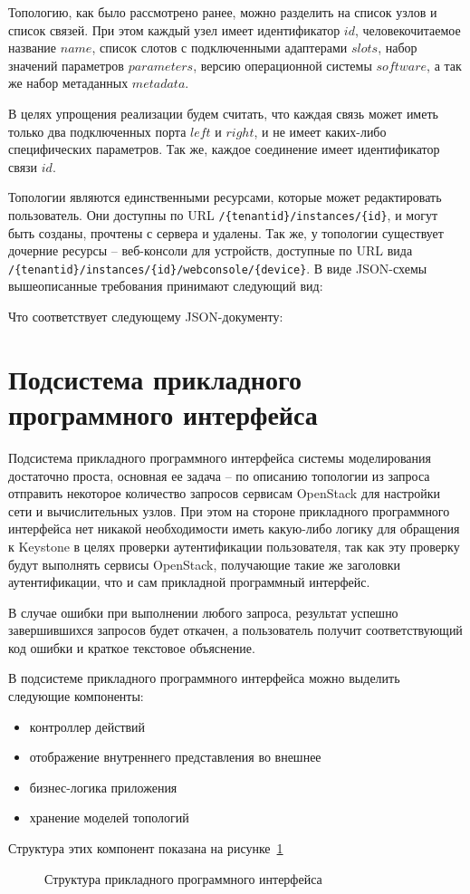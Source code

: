 Топологию, как было рассмотрено ранее, можно разделить на список узлов и список 
связей. При этом каждый узел имеет идентификатор $id$, человекочитаемое название
$name$, список слотов с подключенными адаптерами $slots$, 
набор значений параметров $parameters$, версию операционной системы $software$, 
а так же набор метаданных $metadata$. 

В целях упрощения реализации будем считать, что каждая связь может иметь только два 
подключенных порта  $left$ и $right$, и не имеет каких-либо специфических параметров.
Так же, каждое соединение имеет идентификатор связи $id$.

Топологии являются единственными ресурсами, которые может редактировать пользователь.
Они доступны по URL \verb`/{tenantid}/instances/{id}`, и могут быть созданы, прочтены с сервера и удалены.
Так же, у топологии существует дочерние ресурсы -- веб-консоли для устройств,
доступные по URL вида \verb`/{tenantid}/instances/{id}/webconsole/{device}`.
В виде JSON-схемы вышеописанные требования принимают следующий вид:



Что соответствует следующему JSON-документу:




\section{Подсистема прикладного программного интерфейса}

Подсистема прикладного программного интерфейса системы моделирования достаточно проста,
основная ее задача -- по описанию топологии из запроса отправить некоторое количество
запросов сервисам OpenStack для настройки сети и вычислительных узлов.
При этом на стороне прикладного программного интерфейса нет никакой необходимости 
иметь какую-либо логику для обращения к Keystone в целях проверки аутентификации пользователя,
так как эту проверку будут выполнять сервисы OpenStack, получающие такие же заголовки
аутентификации, что и сам прикладной программный интерфейс.

В случае ошибки при выполнении любого запроса, результат успешно завершившихся запросов
будет откачен, а пользователь получит соответствующий код ошибки и краткое текстовое объяснение.

В подсистеме прикладного программного интерфейса можно выделить следующие компоненты:
\begin{itemize}
    \item контроллер действий
    \item отображение внутреннего представления во внешнее
    \item бизнес-логика приложения
    \item хранение моделей топологий
\end{itemize}
Структура этих компонент показана на рисунке~\ref{fig:api-uml}
\begin{figure}
  \centering
  {\footnotesize\tt}
  \caption{Структура прикладного программного интерфейса}
  \label{fig:api-uml}
\end{figure} 

